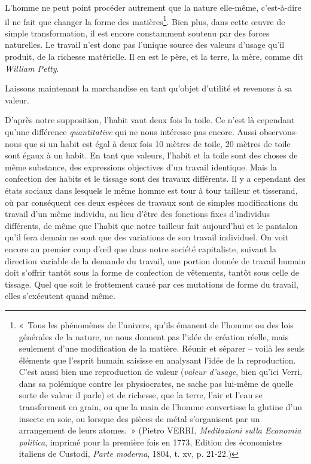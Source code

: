 \documentclass[french,twoside]{book} %
\begin{document}
L’homme ne peut point procéder autrement que la nature elle-même, c’est-à-dire il ne fait que changer la forme des matières\footnote{« Tous les phénomènes de l’univers, qu’ils émanent de l’homme ou des lois générales de la nature, ne nous donnent pas l’idée de création réelle, mais seulement d’une modification de la matière. Réunir et séparer – voilà les seuls éléments que l’esprit humain saisisse en analysant l’idée de la reproduction. C’est aussi bien une reproduction de valeur (\emph{valeur d’usage}, bien qu’ici Verri, dans sa polémique contre les physiocrates, ne sache pas lui-même de quelle sorte de valeur il parle) et de richesse, que la terre, l’air et l’eau se transforment en grain, ou que la main de l’homme convertisse la glutine d’un insecte en soie, ou lorsque des pièces de métal s’organisent par un arrangement de leurs atomes. » (Pietro VERRI, \emph{Meditazioni sulla Economia politica}, imprimé pour la première fois en 1773, Edition des économistes italiens de Custodi, \emph{Parte moderna}, 1804, t. xv, p. 21-22.)}. Bien plus, dans cette œuvre de simple transformation, il est encore constamment soutenu par des forces naturelles. Le travail n’est donc pas l’unique source des valeurs d’usage qu’il produit, de la richesse matérielle. Il en est le père, et la terre, la mère, comme dit \emph{William Petty}.\par
Laissons maintenant la marchandise en tant qu’objet d’utilité et revenons à sa valeur.\par
D’après notre supposition, l’habit vaut deux fois la toile. Ce n’est là cependant qu’une différence \emph{quantitative} qui ne nous intéresse pas encore. Aussi observons-nous que si un habit est égal à deux fois 10 mètres de toile, 20 mètres de toile sont égaux à un habit. En tant que valeurs, l’habit et la toile sont des choses de même substance, des expressions objectives d’un travail identique. Mais la confection des habits et le tissage sont des travaux différents. Il y a cependant des états sociaux dans lesquels le même homme est tour à tour tailleur et tisserand, où par conséquent ces deux espèces de travaux sont de simples modifications du travail d’un même individu, au lieu d’être des fonctions fixes d’individus différents, de même que l’habit que notre tailleur fait aujourd’hui et le pantalon qu’il fera demain ne sont que des variations de son travail individuel. On voit encore au premier coup d’œil que dans notre société capitaliste, suivant la direction variable de la demande du travail, une portion donnée de travail humain doit s’offrir tantôt sous la forme de confection de vêtements, tantôt sous celle de tissage. Quel que soit le frottement causé par ces mutations de forme du travail, elles s’exécutent quand même.\par
\end{document}
